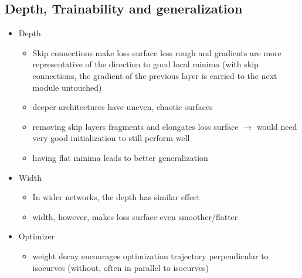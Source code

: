 \subsection{Depth, Trainability and generalization}
\begin{itemize}
	\item Depth
	\begin{itemize}
	\item Skip connections make loss surface less rough and gradients are more representative of the direction to good local minima (with skip connections, the gradient of the previous layer is carried to the next module untouched)
	\item deeper architectures have uneven, chaotic surfaces
	\item removing skip layers fragments and elongates loss surface $\rightarrow$ would need very good initialization to still perform well
	\item having flat minima leads to better generalization
	\end{itemize}
	\item Width
	\begin{itemize}
	\item In wider networks, the depth has similar effect
	\item width, however, makes loss surface even smoother/flatter
	\end{itemize}
	\item Optimizer
	\begin{itemize}
		\item weight decay encourages optimization trajectory perpendicular to isocurves (without, often in parallel to isocurves)
	\end{itemize}
\end{itemize}